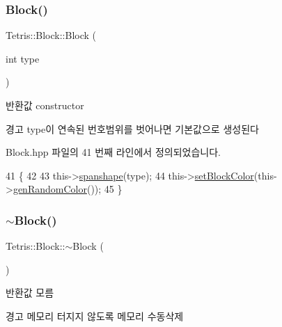 \subsubsection{\texorpdfstring{Block()}{Block()}\hspace{0.1cm}{\footnotesize\ttfamily [3/4]}}
{\footnotesize\ttfamily Tetris\+::\+Block\+::\+Block (\begin{DoxyParamCaption}\item[{int}]{type }\end{DoxyParamCaption})\hspace{0.3cm}{\ttfamily [inline]}}

\begin{DoxyReturn}{반환값}
constructor 
\end{DoxyReturn}
\begin{DoxyWarning}{경고}
type이 연속된 번호범위를 벗어나면 기본값으로 생성된다 
\end{DoxyWarning}


Block.\+hpp 파일의 41 번째 라인에서 정의되었습니다.


\begin{DoxyCode}
41                            \{
42                
43                 this->\hyperlink{class_tetris_1_1_block_ad683f161157c16b80d5df8929bca468c}{spanshape}(type);
44                 this->\hyperlink{class_tetris_1_1_block_a1a3fab9e7eabe64a4ba588ed5091d3a9}{setBlockColor}(this->\hyperlink{class_tetris_1_1_block_a4bae85cab786853cb3ff76aa7fe72edc}{genRandomColor}());
45             \}
\end{DoxyCode}
\mbox{\label{class_tetris_1_1_block_a20012167d55a996d56825d99082419c6}} 
\subsubsection{\texorpdfstring{$\sim$\+Block()}{~Block()}\hspace{0.1cm}{\footnotesize\ttfamily [2/2]}}
{\footnotesize\ttfamily Tetris\+::\+Block\+::$\sim$\+Block (\begin{DoxyParamCaption}{ }\end{DoxyParamCaption})\hspace{0.3cm}{\ttfamily [inline]}}

\begin{DoxyReturn}{반환값}
모름 
\end{DoxyReturn}
\begin{DoxyWarning}{경고}
메모리 터지지 않도록 메모리 수동삭제 
\end{DoxyWarning}


